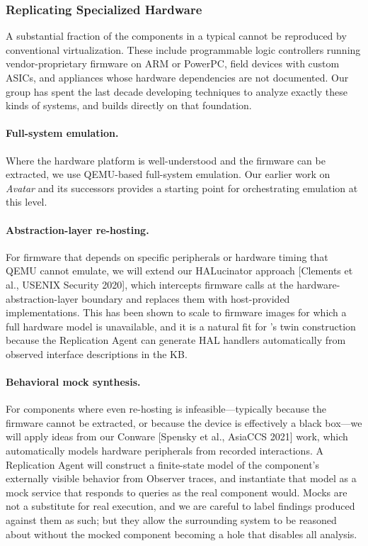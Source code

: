 \subsubsection{Replicating Specialized Hardware}

A substantial fraction of the components in a typical \cps cannot be
reproduced by conventional virtualization. These include programmable
logic controllers running vendor-proprietary firmware on ARM or PowerPC,
field devices with custom ASICs, and appliances whose hardware
dependencies are not documented. Our group has spent the last decade
developing techniques to analyze exactly these kinds of systems, and
\sysname builds directly on that foundation.

\paragraph{Full-system emulation.}
Where the hardware platform is well-understood and the firmware can
be extracted, we use QEMU-based full-system emulation. Our earlier
work on \emph{Avatar} and its successors provides a starting point
for orchestrating emulation at this level.

\paragraph{Abstraction-layer re-hosting.}
For firmware that depends on specific peripherals or hardware timing
that QEMU cannot emulate, we will extend our HALucinator
approach [Clements et al., USENIX Security 2020], which intercepts firmware calls at the
hardware-abstraction-layer boundary and replaces them with
host-provided implementations. This has been shown to scale to
firmware images for which a full hardware model is unavailable, and
it is a natural fit for \sysname's twin construction because the
Replication Agent can generate HAL handlers automatically from
observed interface descriptions in the KB.

\paragraph{Behavioral mock synthesis.}
For components where even re-hosting is infeasible---typically
because the firmware cannot be extracted, or because the device is
effectively a black box---we will apply ideas from our
Conware [Spensky et al., AsiaCCS 2021] work, which automatically models hardware
peripherals from recorded interactions. A Replication Agent will
construct a finite-state model of the component's externally visible
behavior from Observer traces, and instantiate that model as a mock
service that responds to queries as the real component would. Mocks
are not a substitute for real execution, and we are careful to label
findings produced against them as such; but they allow the surrounding
system to be reasoned about without the mocked component becoming a
hole that disables all analysis.

